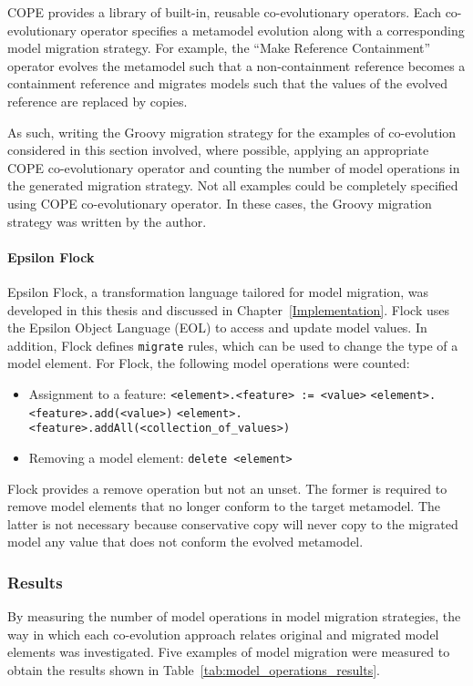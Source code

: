 COPE provides a library of built-in, reusable co-evolutionary operators. Each co-evolutionary operator specifies a metamodel evolution along with a corresponding model migration strategy. For example, the ``Make Reference Containment'' operator evolves the metamodel such that a non-containment reference becomes a containment reference and migrates models such that the values of the evolved reference are replaced by copies.

As such, writing the Groovy migration strategy for the examples of co-evolution considered in this section involved, where possible, applying an appropriate COPE co-evolutionary operator and counting the number of model operations in the generated migration strategy. Not all examples could be completely specified using COPE co-evolutionary operator. In these cases, the Groovy migration strategy was written by the author.


\paragraph{Epsilon Flock}
Epsilon Flock, a transformation language tailored for model migration, was developed in this thesis and discussed in Chapter~\ref{Implementation}. Flock uses the Epsilon Object Language (EOL) \cite{kolovos06eol} to access and update model values. In addition, Flock defines \texttt{migrate} rules, which can be used to change the type of a model element. For Flock, the following model operations were counted:

\begin{itemize}
	\item Assignment to a feature:
	\subitem \texttt{<element>.<feature> := <value>} 
	\subitem \texttt{<element>.<feature>.add(<value>)}
	\subitem \texttt{<element>.<feature>.addAll(<collection\_of\_values>)}
	
	\item Removing a model element:
	\subitem \texttt{delete <element>}
\end{itemize}

Flock provides a remove operation but not an unset. The former is required to remove model elements that no longer conform to the target metamodel. The latter is not necessary because conservative copy will never copy to the migrated model any value that does not conform the evolved metamodel. 


\subsubsection{Results}
\label{subsec:quantitive_results}
By measuring the number of model operations in model migration strategies, the way in which each co-evolution approach relates original and migrated model elements was investigated. Five examples of model migration were measured to obtain the results shown in Table~\ref{tab:model_operations_results}. 

